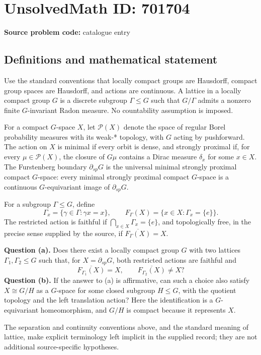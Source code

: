 \documentclass[11pt]{article}
\begin{document}
\section*{UnsolvedMath ID: 701704}
\textbf{Source problem code:} catalogue entry
\subsection{Definitions and mathematical statement}
Use the standard conventions that locally compact groups are Hausdorff, compact group spaces are Hausdorff, and actions are continuous. A lattice in a locally compact group $G$ is a discrete subgroup $\Gamma\leq G$ such that $G/\Gamma$ admits a nonzero finite $G$-invariant Radon measure. No countability assumption is imposed.

For a compact $G$-space $X$, let $\mathcal P(X)$ denote the space of regular Borel probability measures with its weak-* topology, with $G$ acting by pushforward. The action on $X$ is minimal if every orbit is dense, and strongly proximal if, for every $\mu\in\mathcal P(X)$, the closure of $G\mu$ contains a Dirac measure $\delta_x$ for some $x\in X$. The Furstenberg boundary $\partial_{sp}G$ is the universal minimal strongly proximal compact $G$-space: every minimal strongly proximal compact $G$-space is a continuous $G$-equivariant image of $\partial_{sp}G$.

For a subgroup $\Gamma\leq G$, define
\[
\Gamma_x=\{\gamma\in\Gamma:\gamma x=x\},\qquad
F_\Gamma(X)=\{x\in X:\Gamma_x=\{e\}\}.
\]
The restricted action is faithful if $\bigcap_{x\in X}\Gamma_x=\{e\}$, and topologically free, in the precise sense supplied by the source, if $\overline{F_\Gamma(X)}=X$.

\textbf{Question (a).} Does there exist a locally compact group $G$ with two lattices $\Gamma_1,\Gamma_2\leq G$ such that, for $X=\partial_{sp}G$, both restricted actions are faithful and
\[
\overline{F_{\Gamma_1}(X)}=X,
\qquad
\overline{F_{\Gamma_2}(X)}\ne X?
\]
\textbf{Question (b).} If the answer to (a) is affirmative, can such a choice also satisfy $X\cong G/H$ as a $G$-space for some closed subgroup $H\leq G$, with the quotient topology and the left translation action? Here the identification is a $G$-equivariant homeomorphism, and $G/H$ is compact because it represents $X$.

The separation and continuity conventions above, and the standard meaning of lattice, make explicit terminology left implicit in the supplied record; they are not additional source-specific hypotheses.
\end{document}

